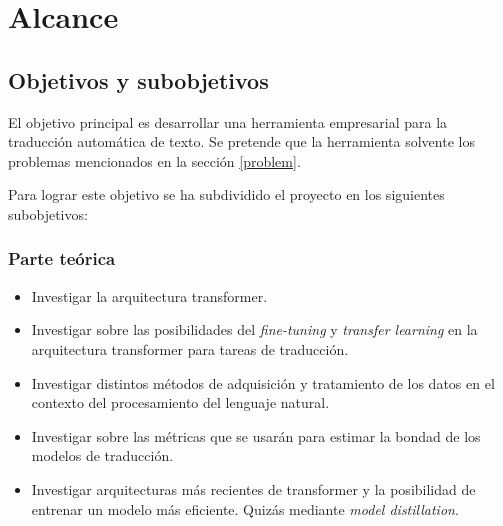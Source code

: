 \chapter{Alcance}
\section{Objetivos y subobjetivos}\label{objectives}
El objetivo principal es desarrollar una herramienta empresarial para la traducción automática
de texto.
Se pretende que la herramienta solvente los problemas mencionados en la sección \ref{problem}.

Para lograr este objetivo se ha subdividido el proyecto en los siguientes subobjetivos:

\subsection*{Parte teórica}
    \begin{itemize}
        \item Investigar la arquitectura transformer.
        \item Investigar sobre las posibilidades del \textit{fine-tuning} y \textit{transfer learning}
            en la arquitectura transformer para tareas de traducción.
        \item Investigar distintos métodos de adquisición y tratamiento de los datos en el contexto del
            procesamiento del lenguaje natural.
        \item Investigar sobre las métricas que se usarán para estimar la bondad de los modelos de traducción.
        \item Investigar arquitecturas más recientes de transformer y la posibilidad de entrenar
        un modelo más eficiente. Quizás mediante \textit{model distillation}.
    \end{itemize}
